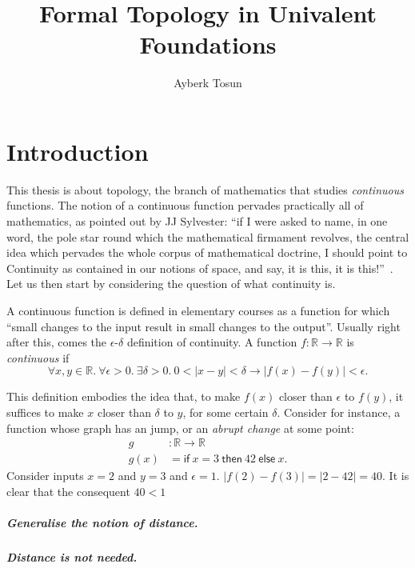 

\title{Formal Topology in Univalent Foundations}
\author{Ayberk Tosun}





\newcommand{\reals}{\mathbb{R}}



\makefrontmatter{}

\chapter{Introduction}


This thesis is about topology, the branch of mathematics that studies \emph{continuous}
functions. The notion of a continuous function pervades practically all of mathematics, as
pointed out by JJ Sylvester: ``if I were asked to name, in one word, the pole star round
which the mathematical firmament revolves, the central idea which pervades the whole
corpus of mathematical doctrine, I should point to Continuity as contained in our notions
of space, and say, it is this, it is this!''~\cite[pg. 27]{armstrong_basic_2011}. Let us
then start by considering the question of what continuity is.

A continuous function is defined in elementary courses as a function for which ``small
changes to the input result in small changes to the output''. Usually right after this,
comes the $\epsilon$-$\delta$ definition of continuity. A function $f : \reals{} \rightarrow \reals{}$ is
\emph{continuous} if
\begin{equation*}
  \forall x, y \in \reals{}.\ \forall \epsilon > 0.\ \exists \delta > 0.\ 0 < | x - y | < \delta \rightarrow | f(x) - f(y) | < \epsilon.
\end{equation*}

This definition embodies the idea that, to make $f(x)$ closer than $\epsilon$ to $f(y)$, it
suffices to make $x$ closer than $\delta$ to $y$, for some certain $\delta$. Consider for instance,
a function whose graph has an jump, or an \emph{abrupt change} at some point:
\begin{align*}
  g    &: \reals{} \rightarrow \reals{}\\
  g(x) &= \mathsf{if}\ x = 3\ \mathsf{then}\ 42\ \mathsf{else}\ x.
\end{align*}
Consider inputs $x = 2$ and $y = 3$ and $\epsilon = 1$. $| f(2) - f(3) | = | 2 - 42 | = 40$. It
is clear that the consequent $40 < 1$

\paragraph{Generalise the notion of distance.}

\paragraph{Distance is not needed.}

\lipsum[1-3]


